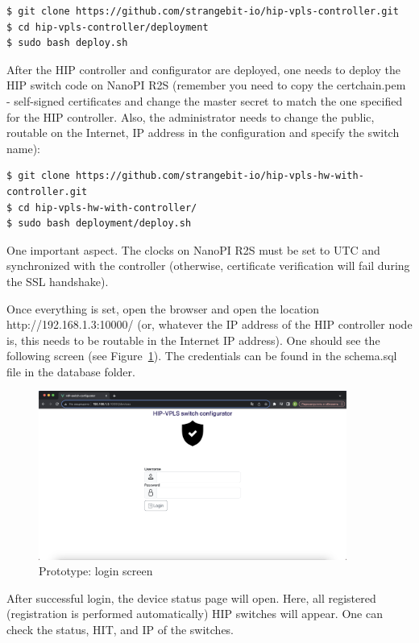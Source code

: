 \begin{verbatim}
$ git clone https://github.com/strangebit-io/hip-vpls-controller.git
$ cd hip-vpls-controller/deployment
$ sudo bash deploy.sh
\end{verbatim}

After the HIP controller and configurator are deployed, 
one needs to deploy the HIP switch code on NanoPI R2S 
(remember you need to copy the certchain.pem - self-signed 
certificates and change the master secret to match the one 
specified for the HIP controller. Also, the administrator 
needs to change the public, routable on the Internet, 
IP address in the configuration and specify the switch name):


\begin{verbatim}
$ git clone https://github.com/strangebit-io/hip-vpls-hw-with-controller.git
$ cd hip-vpls-hw-with-controller/
$ sudo bash deployment/deploy.sh
\end{verbatim}

One important aspect. The clocks on NanoPI R2S must be set to UTC and 
synchronized with the controller (otherwise, certificate verification 
will fail during the SSL handshake).

Once everything is set, open the browser and open the location 
http://192.168.1.3:10000/ (or, whatever the IP address of the HIP 
controller node is, this needs to be routable in the Internet IP 
address). One should see the following screen (see 
Figure~\ref{fig:login}). The credentials can be found in the 
schema.sql file in the database folder. 

\begin{figure}[h!]
\centering
\includegraphics[width=0.9\textwidth]{graphics/login_screen.png}
\caption{Prototype: login screen}
\label{fig:login}
\end{figure}

After successful login, the device status page will open. Here, 
all registered (registration is performed automatically) HIP 
switches will appear. One can check the status, HIT, and IP of the 
switches.


